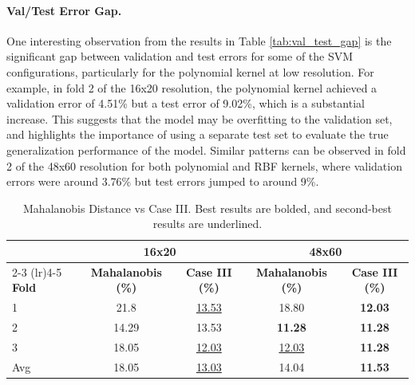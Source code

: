 \documentclass[12pt, letterpaper]{article}
\begin{document}
\paragraph{Val/Test Error Gap.}
One interesting observation from the results in Table \ref{tab:val_test_gap} is the significant gap between validation and test errors for some of the SVM configurations, particularly for the
polynomial kernel at low resolution. For example, in fold 2 of the 16x20 resolution, the polynomial kernel achieved a validation error of 4.51\% but a test error
of 9.02\%, which is a substantial increase. This suggests that the model may be overfitting to the validation set, and highlights the importance of using a separate
test set to evaluate the true generalization performance of the model. Similar patterns can be observed in fold 2 of the 48x60 resolution for both polynomial and RBF
kernels, where validation errors were around 3.76\% but test errors jumped to around 9\%.

\begin{table}[htbp]
	\centering
	\caption{Mahalanobis Distance vs Case III. Best results are bolded, and second-best results are underlined.}
	\begin{tabular}{lcccc}
		\toprule
		              & \multicolumn{2}{c}{\textbf{16x20}} & \multicolumn{2}{c}{\textbf{48x60}}                                                      \\
		\cmidrule(lr){2-3} \cmidrule(lr){4-5}
		\textbf{Fold} & \textbf{Mahalanobis (\%)}          & \textbf{Case III (\%)}             & \textbf{Mahalanobis (\%)} & \textbf{Case III (\%)} \\
		\midrule
		1             & 21.8                               & \underline{13.53}                  & 18.80                     & \textbf{12.03}         \\
		2             & 14.29                              & 13.53                              & \textbf{11.28}            & \textbf{11.28}         \\
		3             & 18.05                              & \underline{12.03}                  & \underline{12.03}         & \textbf{11.28}         \\
		\midrule
		Avg           & 18.05                              & \underline{13.03}                  & 14.04                     & \textbf{11.53}         \\
		\bottomrule
	\end{tabular}
	\label{tab:mahalanobis_caseIII}
\end{table}
\end{document}
